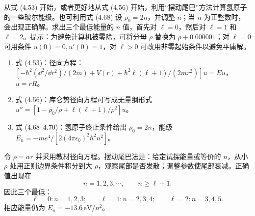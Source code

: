 \begin{question}
从式 (4.53) 开始，或者更好地从式 (4.56) 开始，利用“摆动尾巴”方法计算氢原子的一些玻尔能级。也可利用式 (4.68) 设 $\rho_0=2n$，并调整 $n$；当 $n$ 为正整数时，会出现正确解。求出三个最低能量的 $n$ 值，首先对 $\ell=0$，然后对 $\ell=1$ 和 $\ell=2$。提示：为避免计算机被零除，可将分母 $\rho$ 替换为 $\rho+0.000001$；对 $\ell=0$ 可用条件 $u(0)=0,u'(0)=1$，对 $\ell>0$ 可改用非零起始条件以避免平庸解。

\par\smallskip
{}
\begin{enumerate}[leftmargin=2.2em,itemsep=0.12em,topsep=0.12em,parsep=0pt]
\item 式 (4.53)：径向方程：$[-\hbar^2(\dd^2/\dd r^2)/(2m)+V(r)+\hbar^2\ell(\ell+1)/(2mr^2)]u=Eu$，$u=rR$。
\item 式 (4.56)：库仑势径向方程可写成无量纲形式 $u''=[1-\rho_0/\rho+\ell(\ell+1)/\rho^2]u$。
\item 式 (4.68--4.70)：氢原子终止条件给出 $\rho_0=2n$，能级 $E_n=-me^4/[2(4\pi\epsilon_0)^2\hbar^2n^2]$。
\end{enumerate}

\end{question}
\begin{solution}

令 $\rho=\alpha r$ 并采用教材径向方程。摆动尾巴法是：给定试探能量或等价的 $n$，从小 $\rho$ 处用正则边界条件积分到大 $\rho$，观察尾部是否发散；调整参数使尾部衰减。正确值出现在
\[
n=1,2,3,\cdots,
\qquad n\ge\ell+1.
\]
因此三个最低：
\[
\ell=0: n=1,2,3;
\qquad
\ell=1: n=2,3,4;
\qquad
\ell=2: n=3,4,5.
\]
相应能量仍为 $E_n=-13.6\,\mathrm{eV}/n^2$。

\end{solution}

